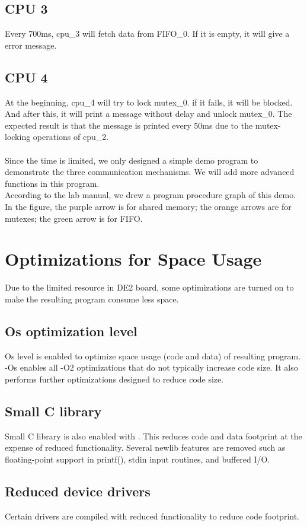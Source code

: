 \documentclass[conference]{IEEEtran}
\begin{document}
\subsection{CPU 3}
Every 700ms, cpu\_3 will fetch data from FIFO\_0. If it is empty, it will give a error message.
\subsection{CPU 4}
At the beginning, cpu\_4 will try to lock mutex\_0. if it fails, it will be blocked. And after this, it will print a message without delay and unlock mutex\_0. The expected result is that the message is printed every 50ms due to the mutex-locking operations of cpu\_2.\\
\\
\indent
Since the time is limited, we only designed a simple demo program to demonstrate the three communication mechanisms. We will add more advanced functions in this program.\\
\indent
According to the lab manual, we drew a program procedure graph of this demo. In the figure, the purple arrow is for shared memory; the orange arrows are for mutexes; the green arrow is for FIFO.
\section{Optimizations for Space Usage}
Due to the limited resource in DE2 board, some optimizations are turned on to make the resulting program consume less space.
\subsection{Os optimization level}
Os level is enabled to optimize space usage (code and data) of resulting program. -Os enables all -O2 optimizations that do not typically increase code size. It also performs further optimizations designed to reduce code size\cite{osGNUlevel}.
\subsection{Small C library}
Small C library is also enabled with . This reduces code and data footprint at the expense of reduced functionality. Several newlib features are removed such as floating-point support in printf(), stdin input routines, and buffered I/O.
\subsection{Reduced device drivers}
Certain drivers are compiled with reduced functionality to reduce code footprint.
\end{document}
